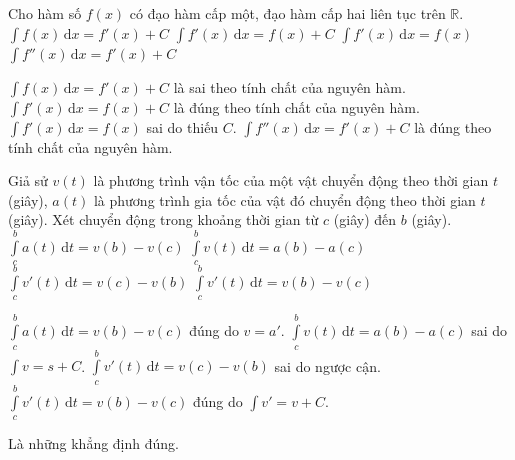 \begin{ex}%
	Cho hàm số $f(x)$ có đạo hàm cấp một, đạo hàm cấp hai liên tục trên $\mathbb{R}$.
	\choiceTF
	{$\displaystyle\int f(x) {\,\mathrm{d}}x =f'(x)+C$}
	{\True $\displaystyle\int f'(x) {\,\mathrm{d}}x =f(x)+C$}
	{$\displaystyle\int f'(x) {\,\mathrm{d}}x =f(x)$}
	{\True $\displaystyle\int f''(x) {\,\mathrm{d}}x =f'(x)+C$}
	\loigiai
	{
	\begin{itemchoice}
	\itemch $\displaystyle\int f(x) {\,\mathrm{d}}x =f'(x)+C$ là sai theo tính chất của nguyên hàm.
	\itemch $\displaystyle\int f'(x) {\,\mathrm{d}}x =f(x)+C$ là đúng theo tính chất của nguyên hàm.
	\itemch $\displaystyle\int f'(x) {\,\mathrm{d}}x =f(x)$ sai do thiếu $C$.
	\itemch $\displaystyle\int f''(x) {\,\mathrm{d}}x =f'(x)+C$ là đúng theo tính chất của nguyên hàm.
	\end{itemchoice}
	}
\end{ex}
\begin{ex}%
	Giả sử $v(t)$ là phương trình vận tốc của một vật chuyển động theo thời gian $t$ (giây), $a(t)$ là phương trình gia tốc của vật đó chuyển động theo thời gian $t$ (giây). Xét chuyển động trong khoảng thời gian từ $c$ (giây) đến $b$ (giây).
	\choiceTF
	{\True $\displaystyle\int\limits_c^b a(t)\mathrm{\,d}t=v(b)-v(c)$}
	{$\displaystyle\int\limits_c^b v(t)\mathrm{\,d}t=a(b)-a(c)$}
	{$\displaystyle\int\limits_c^b v'(t)\mathrm{\,d}t=v(c)-v(b)$}
	{\True $\displaystyle\int\limits_c^b v'(t)\mathrm{\,d}t=v(b)-v(c)$}
	\loigiai
	{
	\begin{itemchoice}
	\itemch $\displaystyle\int\limits_c^b a(t)\mathrm{\,d}t=v(b)-v(c)$ đúng do $v=a'$.
	\itemch $\displaystyle\int\limits_c^b v(t)\mathrm{\,d}t=a(b)-a(c)$ sai do $\displaystyle\int v = s+C$.
	\itemch $\displaystyle\int\limits_c^b v'(t)\mathrm{\,d}t=v(c)-v(b)$ sai do ngược cận.
	\itemch $\displaystyle\int\limits_c^b v'(t)\mathrm{\,d}t=v(b)-v(c)$ đúng do $\displaystyle\int v' = v+C$.
	\end{itemchoice}
	Là những khẳng định đúng.
	}
\end{ex}
